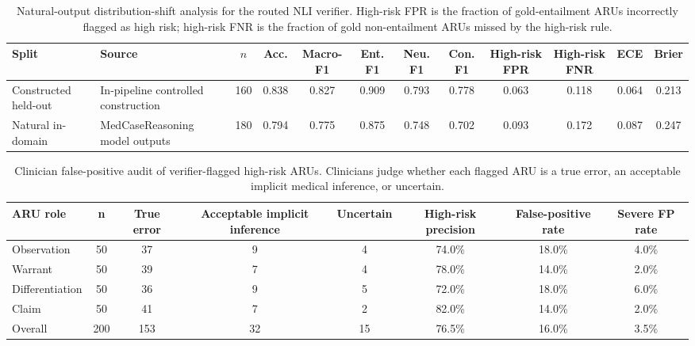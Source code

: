 \documentclass[a4paper,fleqn,doubleblind]{cas-sc}
\begin{document}
\begin{table}[htbp]
    \centering
    \scriptsize
    \setlength{\tabcolsep}{3pt}
    \caption{Natural-output distribution-shift analysis for the routed NLI verifier. High-risk FPR is the fraction of gold-entailment ARUs incorrectly flagged as high risk; high-risk FNR is the fraction of gold non-entailment ARUs missed by the high-risk rule.}
    \label{tab:nli_natural_output_shift}
    \begin{adjustbox}{max width=\textwidth}
    \begin{tabular}{llcccccccccc}
        \toprule
        \textbf{Split} & \textbf{Source} & \textbf{$n$} & \textbf{Acc.} & \textbf{Macro-F1} & \textbf{Ent. F1} & \textbf{Neu. F1} & \textbf{Con. F1} & \textbf{High-risk FPR} & \textbf{High-risk FNR} & \textbf{ECE} & \textbf{Brier} \\
        \midrule
        Constructed held-out & In-pipeline controlled construction & 160 & 0.838 & 0.827 & 0.909 & 0.793 & 0.778 & 0.063 & 0.118 & 0.064 & 0.213 \\
        Natural in-domain & MedCaseReasoning model outputs & 180 & 0.794 & 0.775 & 0.875 & 0.748 & 0.702 & 0.093 & 0.172 & 0.087 & 0.247 \\
        \bottomrule
    \end{tabular}
    \end{adjustbox}
\end{table}

\begin{table}[htbp]
    \centering
    \caption{Clinician false-positive audit of verifier-flagged high-risk ARUs. Clinicians judge whether each flagged ARU is a true error, an acceptable implicit medical inference, or uncertain.}
    \label{tab:high_risk_aru_clinician_audit}
    \begin{adjustbox}{max width=0.98\textwidth}
    \begin{tabular}{lccccccc}
        \toprule
        \textbf{ARU role} & \textbf{n} & \textbf{True error} & \textbf{Acceptable implicit inference} & \textbf{Uncertain} & \textbf{High-risk precision} & \textbf{False-positive rate} & \textbf{Severe FP rate} \\
        \midrule
        Observation & 50 & 37 & 9 & 4 & 74.0\% & 18.0\% & 4.0\% \\
        Warrant & 50 & 39 & 7 & 4 & 78.0\% & 14.0\% & 2.0\% \\
        Differentiation & 50 & 36 & 9 & 5 & 72.0\% & 18.0\% & 6.0\% \\
        Claim & 50 & 41 & 7 & 2 & 82.0\% & 14.0\% & 2.0\% \\
        \midrule
        Overall & 200 & 153 & 32 & 15 & 76.5\% & 16.0\% & 3.5\% \\
        \bottomrule
    \end{tabular}
    \end{adjustbox}
\end{table}
\end{document}
